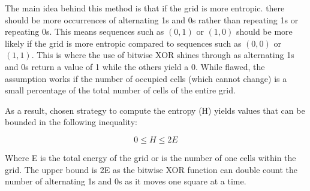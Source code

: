 \vspace{0.3cm}
\noindent
The main idea behind this method is that if the grid is more entropic. there should be more occurrences of alternating 1s and 0s rather than repeating 1s or repeating 0s. This means sequences such as $(0,1)$ or $(1,0)$ should be more likely if the grid is more entropic compared to sequences such as $(0,0)$ or $(1,1)$. This is where the use of bitwise XOR shines through as alternating 1s and 0s return a value of 1 while the others yield a 0. While flawed, the assumption works if the number of occupied cells (which cannot change) is a small percentage of the total number of cells of the entire grid. \par

\vspace{0.3cm}
\noindent
As a result, chosen strategy to compute the entropy (H) yields values that can be bounded in the following inequality:

$$0 \leq H \leq 2E$$

Where E is the total energy of the grid or is the number of one cells within the grid. The upper bound is 2E as the bitwise XOR function can double count the number of alternating 1s and 0s as it moves one square at a time. \par 
